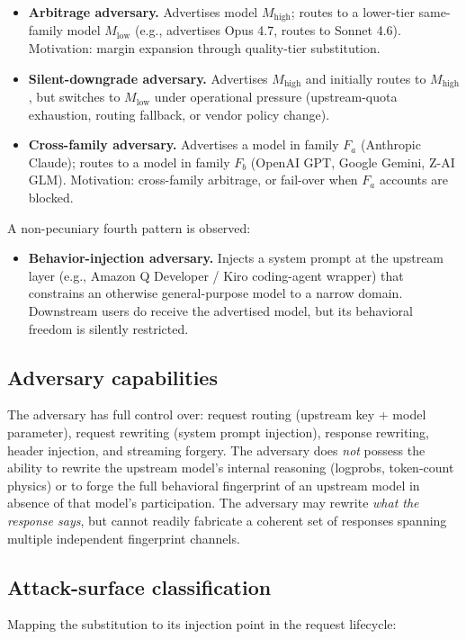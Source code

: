 \documentclass[10pt,a4paper,twocolumn]{article}
\begin{document}
\begin{itemize}
\item \textbf{Arbitrage adversary.} Advertises model $M_{\text{high}}$; routes
  to a lower-tier same-family model $M_{\text{low}}$ (e.g., advertises Opus 4.7,
  routes to Sonnet 4.6). Motivation: margin expansion through quality-tier substitution.
\item \textbf{Silent-downgrade adversary.} Advertises $M_{\text{high}}$ and
  initially routes to $M_{\text{high}}$, but switches to $M_{\text{low}}$ under
  operational pressure (upstream-quota exhaustion, routing fallback, or vendor policy change).
\item \textbf{Cross-family adversary.} Advertises a model in family $F_a$
  (Anthropic Claude); routes to a model in family $F_b$ (OpenAI GPT, Google
  Gemini, Z-AI GLM). Motivation: cross-family arbitrage, or fail-over when
  $F_a$ accounts are blocked.
\end{itemize}

A non-pecuniary fourth pattern is observed:

\begin{itemize}
\item \textbf{Behavior-injection adversary.} Injects a system prompt at the
  upstream layer (e.g., Amazon Q Developer / Kiro coding-agent wrapper) that
  constrains an otherwise general-purpose model to a narrow domain. Downstream
  users do receive the advertised model, but its behavioral freedom is
  silently restricted.
\end{itemize}

\subsection{Adversary capabilities}
The adversary has full control over: request routing (upstream key + model
parameter), request rewriting (system prompt injection), response rewriting,
header injection, and streaming forgery. The adversary does \emph{not} possess
the ability to rewrite the upstream model's internal reasoning (logprobs,
token-count physics) or to forge the full behavioral fingerprint of an upstream
model in absence of that model's participation. The adversary may rewrite
\emph{what the response says}, but cannot readily fabricate a coherent set
of responses spanning multiple independent fingerprint channels.

\subsection{Attack-surface classification}
Mapping the substitution to its injection point in the request lifecycle:
\end{document}
